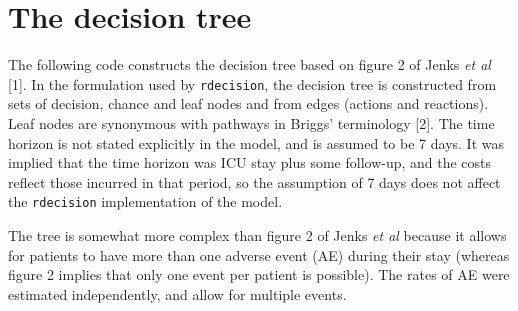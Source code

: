 \documentclass[
]{article}
\newenvironment{Shaded}{\begin{snugshade}}{\end{snugshade}}
\newcommand{\DecValTok}[1]{\textcolor[rgb]{0.00,0.00,0.81}{#1}}
\newcommand{\KeywordTok}[1]{\textcolor[rgb]{0.13,0.29,0.53}{\textbf{#1}}}
\newcommand{\NormalTok}[1]{#1}
\newcommand{\OperatorTok}[1]{\textcolor[rgb]{0.81,0.36,0.00}{\textbf{#1}}}
\newcommand{\StringTok}[1]{\textcolor[rgb]{0.31,0.60,0.02}{#1}}
\begin{document}
\begin{Shaded}
\end{Shaded}

\hypertarget{the-decision-tree}{%
\section{The decision tree}\label{the-decision-tree}}

The following code constructs the decision tree based on figure 2 of
Jenks \emph{et al} {[}1{]}. In the formulation used by
\texttt{rdecision}, the decision tree is constructed from sets of
decision, chance and leaf nodes and from edges (actions and reactions).
Leaf nodes are synonymous with pathways in Briggs' terminology {[}2{]}.
The time horizon is not stated explicitly in the model, and is assumed
to be 7 days. It was implied that the time horizon was ICU stay plus
some follow-up, and the costs reflect those incurred in that period, so
the assumption of 7 days does not affect the \texttt{rdecision}
implementation of the model.

The tree is somewhat more complex than figure 2 of Jenks \emph{et al}
because it allows for patients to have more than one adverse event (AE)
during their stay (whereas figure 2 implies that only one event per
patient is possible). The rates of AE were estimated independently, and
allow for multiple events.
\end{document}
